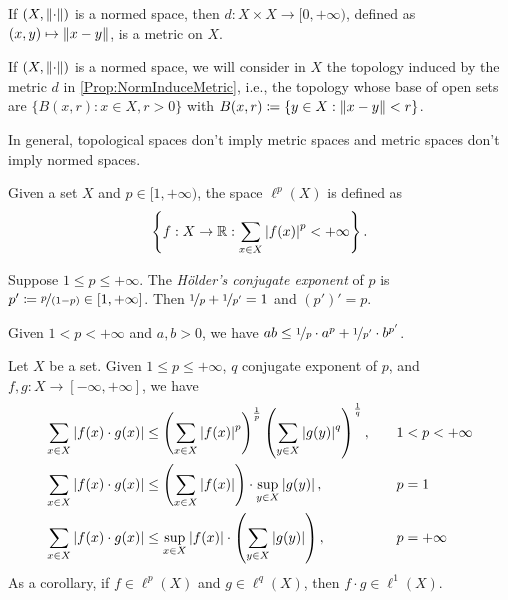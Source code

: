 \documentclass[screen]{techreport}
\numberwithin{equation}{section}
\begin{document}
\begin{proposition}\label{Prop:NormInduceMetric}
	If $(X,\left\|{\cdot}\right\|)$ is a normed space, then $d : X \times X \to [0,+\infty)$, defined as $(x,y) \mapsto \left\|{x-y}\right\|$, is a metric on $X$.
\end{proposition}

\begin{remark}\label{Rem:NormedBalls}
	If $(X,\left\|{\cdot}\right\|)$ is a normed space, we will consider in $X$ the topology induced by the metric $d$ in \cref{Prop:NormInduceMetric}, i.e., the topology whose base of open sets are $\{ B(x,r) : x \in X, r > 0 \}$ with $B(x,r) \coloneqq \{ y \in X : \left\|{x-y}\right\| < r \}$.
\end{remark}

\begin{remark}\label{Rem:MetricNotImplyNorm}
	In general, topological spaces don't imply metric spaces and metric spaces don't imply normed spaces.
\end{remark}

\begin{definition}\label{De:lpSpaces}
	Given a set $X$ and $p \in [1,+\infty)$, the space $\ell^p(X)$ is defined as
	\begin{equation*}
		\left\{ { f : X \to \mathbb{R} : \sum_{x \in X} \left|{f(x)}\right|^p < +\infty } \right\}.
	\end{equation*}
\end{definition}

\begin{definition}\label{De:HoldersConjugateExponent}
	Suppose $1 \le p \le +\infty$.
	The \emph{H{\"o}lder's conjugate exponent} of $p$ is $p' \coloneqq \nicefrac{p}{(1-p)} \in [1,+\infty]$.
	Then $\nicefrac{1}{p} + \nicefrac{1}{p'}=1$ and $(p')' = p$.
\end{definition}

\begin{theorem}\label{The:YangsInequality}
	Given $1 < p < +\infty$ and $a,b > 0$, we have $ab \le \nicefrac{1}{p}  \cdot a^p + \nicefrac{1}{p'} \cdot b^{p'}$.
\end{theorem}

\begin{theorem}\label{The:HoldersInequality}
	Let $X$ be a set.
	Given $1 \le p \le +\infty$, $q$ conjugate exponent of $p$, and $f,g: X \to [-\infty,+\infty]$, we have
	\begin{alignat*}{2}
		\sum_{x \in X} \left|{f(x) \cdot g(x)}\right| & \le  \left({ \sum_{x \in X} \left|{f(x)}\right|^p }\right)^{\frac{1}{p}} \left({  \sum_{y \in X} \left|{g(y)}\right|^q }\right)^{\frac{1}{q}}, \quad &&  1 < p < +\infty \\
		\sum_{x \in X} \left|{f(x) \cdot g(x)}\right| & \le \left({ \sum_{x \in X} \left|{f(x)}\right| }\right) \cdot \sup_{y \in X} \left|{g(y)}\right|, \quad &&  p=1 \\
		\sum_{x \in X} \left|{f(x) \cdot g(x)}\right| & \le \sup_{x \in X} \left|{f(x)}\right| \cdot \left({ \sum_{y \in X} \left|{g(y)}\right| }\right), \quad && p=+\infty
	\end{alignat*}
	As a corollary, if $f \in \ell^p(X)$ and $g \in \ell^q(X)$, then $f \cdot g \in \ell^1(X)$.
\end{theorem}
\end{document}
